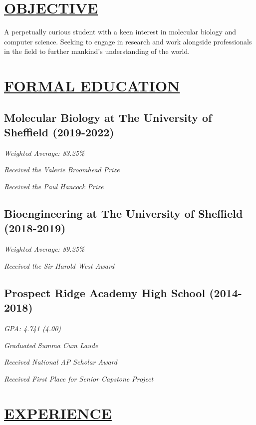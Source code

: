 \documentclass[twocolumn, a4paper, fontsize=9pt, headsepline, footsepline]{scrartcl}
\begin{document}
\setul{}{2pt}
\section*{\ul{OBJECTIVE}}
\noindent
A perpetually curious student with a keen interest in molecular biology and
computer science. Seeking to engage in research and work alongside professionals
in the field to further mankind's understanding of the world.

\section*{\ul{FORMAL EDUCATION}}
\subsection*{Molecular Biology at The University of Sheffield (2019-2022)}
\onehalfspacing
\emph{Weighted Average: 83.25\%}\par
\emph{Received the Valerie Broomhead Prize}\par
\emph{Received the Paul Hancock Prize}\par

\subsection*{Bioengineering at The University of Sheffield (2018-2019)}
\onehalfspacing
\emph{Weighted Average: 89.25\%}\par
\emph{Received the Sir Harold West Award}

\subsection*{Prospect Ridge Academy High School (2014-2018)}
\onehalfspacing
\emph{GPA: 4.741 (4.00)}\par
\emph{Graduated Summa Cum Laude}\par
\emph{Received National AP Scholar Award}\par
\emph{Received First Place for Senior Capstone Project}

\section*{\ul{EXPERIENCE}}
\end{document}
